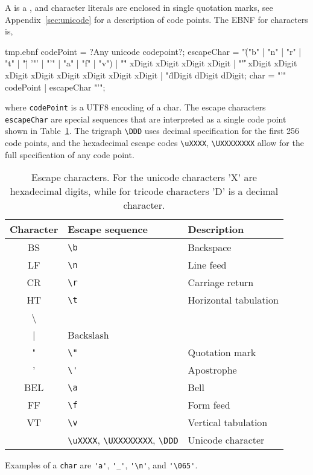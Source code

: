 A  is a  , and character literals are enclosed in single quotation marks, see Appendix~\ref{sec:unicode} for a description of code points. The EBNF for characters is,
%
\begin{verbatimwrite}{tmp.ebnf}
codePoint = ?Any unicode codepoint?;
escapeChar = 
  "\" ("b" | "n" | "r" | "t" | "\" | '"' | "'" | "a" | "f" | "v")
  | "\u" xDigit xDigit xDigit xDigit
  | "\U" xDigit xDigit xDigit xDigit xDigit xDigit xDigit xDigit
  | "\" dDigit dDigit dDigit;
char = "'" codePoint | escapeChar "'";
\end{verbatimwrite}
% 
where \lstinline[language=ebnf]!codePoint! is a UTF8 encoding of a char. The escape characters \lstinline[language=ebnf]{escapeChar} are special sequences that are interpreted as a single code point shown in Table~\ref{tab:escapeChar}. The trigraph \lstinline|\DDD| uses decimal specification for the first 256 code points, and the hexadecimal escape codes \lstinline|\uXXXX|, \lstinline|\UXXXXXXXX| allow for the full specification of any code point.
\begin{table}
  \centering
  \begin{tabular}{|c|l|l|}
    \hline
    Character& Escape sequence & Description\\
    \hline
    BS &\lstinline|\b|& Backspace\\
    LF &\lstinline|\n|&Line feed\\
    CR &\lstinline|\r|&Carriage return\\
    HT &\lstinline|\t|&Horizontal tabulation\\
    \textbackslash &\lstinline|\\|&Backslash\\
     " &\lstinline|\"|&Quotation mark\\
    ' &\lstinline|\'|&Apostrophe\\
    BEL&\lstinline|\a|& Bell\\
    FF&\lstinline|\f|&Form feed\\
    VT &\lstinline|\v|&Vertical tabulation\\
    &\lstinline|\uXXXX|, \lstinline|\UXXXXXXXX|, \lstinline|\DDD|&Unicode character\\
    \hline
  \end{tabular}
  \caption{Escape characters. For the unicode characters 'X' are hexadecimal digits, while for tricode characters 'D' is a decimal character.}
  \label{tab:escapeChar}
\end{table}
Examples of a \lstinline[language=ebnf]!char! are \lstinline{'a'}, \lstinline{'_'}, \lstinline{'\n'}, and \lstinline{'\065'}.

